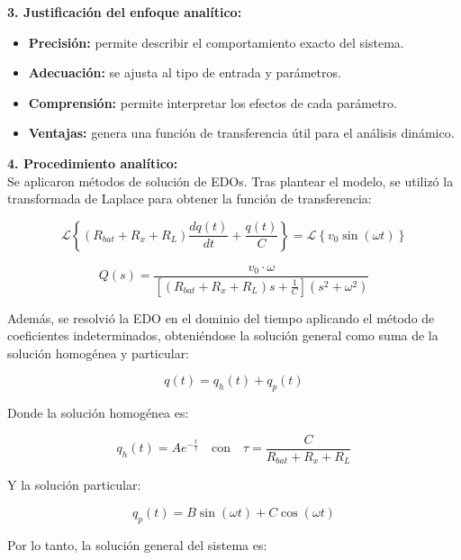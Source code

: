 \documentclass[12pt]{article}
\begin{document}
\begin{tcbposter}
{\begin{multicols}{2}
            \vfill
            \columnbreak
            \textbf{3. Justificación del enfoque analítico:}
            \begin{itemize}
                \item \textbf{Precisión:} permite describir el comportamiento exacto del sistema.
                \item \textbf{Adecuación:} se ajusta al tipo de entrada y parámetros.
                \item \textbf{Comprensión:} permite interpretar los efectos de cada parámetro.
                \item \textbf{Ventajas:} genera una función de transferencia útil para el análisis dinámico.
            \end{itemize}

            \vspace{2mm}

            \textbf{4. Procedimiento analítico:} \\
            Se aplicaron métodos de solución de EDOs. Tras plantear el modelo, se utilizó la transformada de Laplace para obtener la función de transferencia:

            \[
                \mathcal{L}\left\{(R_{bat} + R_x + R_L)\frac{dq(t)}{dt} + \frac{q(t)}{C}\right\} = \mathcal{L} \left\{v_0 \sin(\omega t)\right\}
            \]

            \[
                Q(s) = \frac{v_0 \cdot \omega}{\left[(R_{bat} + R_x + R_L)s + \frac{1}{C}\right](s^2 + \omega^2)}
            \]

            \vspace{2mm}

            Además, se resolvió la EDO en el dominio del tiempo aplicando el método de coeficientes indeterminados, obteniéndose la solución general como suma de la solución homogénea y particular:

            \[
                q(t) = q_h(t) + q_p(t)
            \]

            Donde la solución homogénea es:

            \[
                q_h(t) = Ae^{-\frac{t}{\tau}} \quad \text{con} \quad \tau = \frac{C}{R_{bat} + R_x + R_L}
            \]

            Y la solución particular:

            \[
                q_p(t) = B \sin(\omega t) + C \cos(\omega t)
            \]

            Por lo tanto, la solución general del sistema es:


\end{multicols}}
\end{tcbposter}
\end{document}
